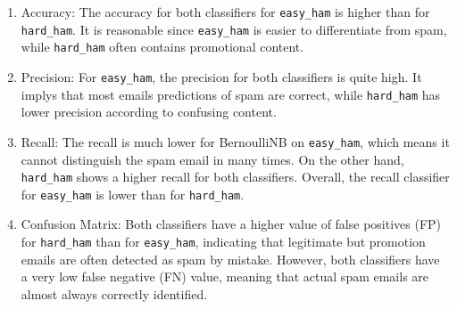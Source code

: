 \documentclass[11pt]{article}
\begin{document}
\begin{enumerate}
\def\labelenumi{\arabic{enumi}.}
\item
  Accuracy: The accuracy for both classifiers for \texttt{easy\_ham} is
  higher than for \texttt{hard\_ham}. It is reasonable since
  \texttt{easy\_ham} is easier to differentiate from spam, while
  \texttt{hard\_ham} often contains promotional content.
\item
  Precision: For \texttt{easy\_ham}, the precision for both classifiers
  is quite high. It implys that most emails predictions of spam are
  correct, while \texttt{hard\_ham} has lower precision according to
  confusing content.
\item
  Recall: The recall is much lower for BernoulliNB on
  \texttt{easy\_ham}, which means it cannot distinguish the spam email
  in many times. On the other hand, \texttt{hard\_ham} shows a higher
  recall for both classifiers. Overall, the recall classifier for
  \texttt{easy\_ham} is lower than for \texttt{hard\_ham}.
\item
  Confusion Matrix: Both classifiers have a higher value of false
  positives (FP) for \texttt{hard\_ham} than for \texttt{easy\_ham},
  indicating that legitimate but promotion emails are often detected as
  spam by mistake. However, both classifiers have a very low false
  negative (FN) value, meaning that actual spam emails are almost always
  correctly identified.
\end{enumerate}


    
    
    
\end{document}
